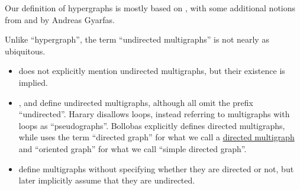 \begin{comments}
  \item Our definition of hypergraphs is mostly based on , with some additional notions from  and \cite[sec. 8.12]{Rosen1999DiscreteHandbook} by Andreas Gyarfas.

  \item Unlike \enquote{hypergraph}, the term \enquote{undirected multigraphs} is not nearly as ubiquitous.
  \begin{itemize}
    \item {} does not explicitly mention undirected multigraphs, but their existence is implied.

    \item {},  and  define undirected multigraphs, although all omit the prefix \enquote{undirected}. Harary disallows loops, instead referring to multigraphs with loops as \enquote{pseudographs}. Bollobas explicitly defines directed multigraphs, while  uses the term \enquote{directed graph} for what we call a \hyperref[def:directed_multigraph]{directed multigraph} and \enquote{oriented graph} for what we call \enquote{simple directed graph}.

    \item {} define multigraphs without specifying whether they are directed or not, but later implicitly assume that they are undirected.
  \end{itemize}
\end{comments}

